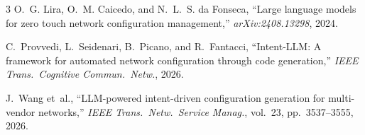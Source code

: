 \documentclass[10.5pt]{article}
\begin{document}
\begin{thebibliography}{3}
\small
{}
O.~G. Lira, O.~M. Caicedo, and N.~L.~S. da Fonseca, ``Large language models for zero touch network configuration management,'' \emph{arXiv:2408.13298}, 2024.

C.~Provvedi, L.~Seidenari, B.~Picano, and R.~Fantacci, ``Intent-LLM: A framework for automated network configuration through code generation,'' \emph{IEEE Trans.\ Cognitive Commun.\ Netw.}, 2026.

J.~Wang et~al., ``LLM-powered intent-driven configuration generation for multi-vendor networks,'' \emph{IEEE Trans.\ Netw.\ Service Manag.}, vol.~23, pp.~3537--3555, 2026.
\end{thebibliography}
\end{document}
